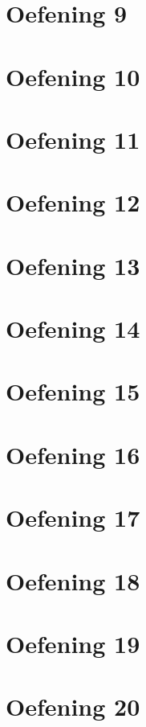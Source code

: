 \documentclass[a4paper,11pt]{report}
\begin{document}
\section{Oefening 9}

\section{Oefening 10}

\section{Oefening 11}

\section{Oefening 12}

\section{Oefening 13}

\section{Oefening 14}

\section{Oefening 15}

\section{Oefening 16}

\section{Oefening 17}

\section{Oefening 18}

\section{Oefening 19}

\section{Oefening 20}


\newpage
\end{document}
